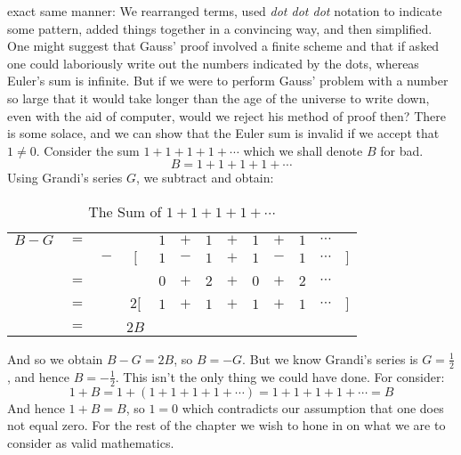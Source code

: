    exact same manner: We rearranged terms, used \textit{dot dot dot} notation
    to indicate some pattern, added things together in a convincing way, and
    then simplified. One might suggest that Gauss' proof involved a finite
    scheme and that if asked one could laboriously write out the numbers
    indicated by the dots, whereas Euler's sum is infinite. But if we were to
    perform Gauss' problem with a number so large that it would take longer
    than the age of the universe to write down, even with the aid of computer,
    would we reject his method of proof then? There is some solace, and we can
    show that the Euler sum is invalid if we accept that $1\ne{0}$. Consider the
    sum $1+1+1+1+\cdots$ which we shall denote $B$ for bad.
    \begin{equation}
        B=1+1+1+1+\cdots
    \end{equation}
    Using Grandi's series $G$, we subtract and obtain:
    \begin{table}[H]
        \centering
        \captionsetup{type=table}
        \begin{tabular}{ccccccccccccc}
            $B-G$&$=$&&       &$1$&$+$&$1$&$+$&$1$&$+$&$1$&$\cdots$\\
                 &&$-$&$\Big[$&$1$&$-$&$1$&$+$&$1$&$-$&$1$&$\cdots$&$\Big]$
            \\[1ex]
            \hline\\
                 &$=$&&&$0$&$+$&$2$&$+$&$0$&$+$&$2$&$\cdots$\\[1ex]
            \hline\\
            &$=$&&$2\Big[$&$1$&$+$&$1$&$+$&$1$&$+$&$1$&$\cdots$&$\Big]$
                \\[1ex]
            \hline\\
            &$=$&&$2B$
        \end{tabular}
        \caption{The Sum of $1+1+1+1+\cdots$}
    \end{table}
    And so we obtain $B-G=2B$, so $B=\minus{G}$. But we know Grandi's series is
    $G=\frac{1}{2}$, and hence $B=\minus\frac{1}{2}$. This isn't the only thing
    we could have done. For consider:
    \begin{equation}
        1+B=1+(1+1+1+1+\cdots)=1+1+1+1+\cdots=B
    \end{equation}
    And hence $1+B=B$, so $1=0$ which contradicts our assumption that one does
    not equal zero. For the rest of the chapter we wish to hone in on what we
    are to consider as valid mathematics.

